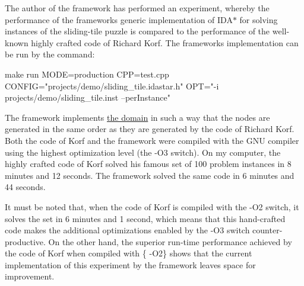 The author of the framework has performed an experiment, whereby the performance of the framework\textquotesingle{}s generic implementation of I\+D\+A$\ast$ for solving instances of the sliding-\/tile puzzle is compared to the performance of the well-\/known highly crafted code of Richard Korf. The framework\textquotesingle{}s implementation can be run by the command\+: \begin{DoxyVerb}make run MODE=production CPP=test.cpp CONFIG="projects/demo/sliding_tile.idastar.h" OPT="-i projects/demo/sliding_tile.inst --perInstance"
\end{DoxyVerb}


The framework implements \hyperlink{structslb_1_1ext_1_1domain_1_1sliding__tile_1_1SlidingTile}{the domain} in such a way that the nodes are generated in the same order as they are generated by the code of Richard Korf. Both the code of Korf and the framework were compiled with the G\+NU compiler using the highest optimization level (the {\ttfamily -\/\+O3} switch). On my computer, the highly crafted code of Korf solved his famous set of 100 problem instances in 8 minutes and 12 seconds. The framework solved the same code in 6 minutes and 44 seconds.

It must be noted that, when the code of Korf is compiled with the {\ttfamily -\/\+O2} switch, it solves the set in 6 minutes and 1 second, which means that this hand-\/crafted code makes the additional optimizations enabled by the {\ttfamily -\/\+O3} switch counter-\/productive. On the other hand, the superior run-\/time performance achieved by the code of Korf when compiled with \{ -\/\+O2\} shows that the current implementation of this experiment by the framework leaves space for improvement.

